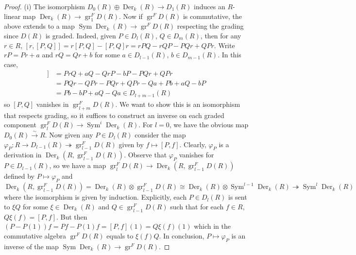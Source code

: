 \documentclass[11pt, a4paper]{article}
\theoremstyle{definition}
\newcommand{\gr}{\operatorname{gr}}
\newcommand{\Sym}[0]{\operatorname{Sym}}
\newcommand{\Der}{\operatorname{Der}}
\begin{document}
    \begin{proof}
        (i) The isomorphism $D_0(R)\oplus \Der_k(R)\to D_1(R)$ induces an $R$-linear map $\Der_k(R)\to \gr^F_1 D(R)$. Now if $\gr^F D(R)$ is commutative, the above extends to a map $\Sym\Der_k(R)\to \gr^F D(R)$ respecting the grading since $D(R)$ is graded. Indeed, given $P\in D_l(R)$, $Q\in D_m(R)$, then for any $r\in R$, $[r,[P, Q]]=r[P, Q]-[P, Q]r=rPQ-rQP-PQr+QPr$. Write $rP=Pr+a$ and $rQ=Qr+b$ for some $a\in D_{l-1}(R)$, $b\in D_{m-1}(R)$. In this case,
        \begin{align*}
            [r, [P, Q]]&=PrQ+aQ-QrP-bP-PQr+QPr\\
            &=PQr-QPr-PQr+QPr-Qa+Pb+aQ-bP\\
            &=Pb-bP+aQ-Qa\in D_{l+m-1}(R)
        \end{align*}
        so $[P, Q]$ vanishes in $\gr^F_{l+m}D(R)$. We want to show this is an isomorphism that respects grading, so it suffices to construct an inverse on each graded component $\gr^F_l D(R)\to \Sym^i \Der_k(R)$. For $l=0$, we have the obvious map $D_0(R)\xrightarrow{\sim} R$. Now given any $P\in D_l(R)$ consider the map $\varphi_P:R\to D_{l-1}(R)\twoheadrightarrow\gr^F_{l-1}D(R)$ given by $f\mapsto [P, f]$. Clearly, $\varphi_P$ is a derivation in $\Der_k(R, \gr^F_{l-1}D(R))$. Observe that $\varphi_P$ vanishes for $P\in D_{l-1}(R)$, so we have a map $\gr_l^FD(R)\to\Der_k(R, \gr^F_{l-1}D(R))$ defined by $P\mapsto\varphi_P$ and
        \[\Der_k(R, \gr^F_{l-1}D(R))=\Der_k(R)\otimes\gr^F_{l-1}D(R)\cong\Der_k(R)\otimes\Sym^{l-1}\Der_k(R)\twoheadrightarrow\Sym^l\Der_k(R)\]
        where the isomorphism is given by induction. Explicitly, each $P\in D_{l}(R)$ is sent to $\xi Q$ for some $\xi\in\Der_k(R)$ and $Q\in \gr^{F}_{l-1}D(R)$ such that for each $f\in R$, $Q\xi(f)=[P, f]$. But then $(P-P(1))f=Pf-P(1)f=[P, f](1)=Q\xi(f)(1)$ which in the commutative algebra $\gr^FD(R)$ equals to $\xi(f)Q$. In conclusion, $P\mapsto\varphi_P$ is an inverse of the map $\Sym\Der_k(R)\to\gr^FD(R)$.


\end{proof}
\end{document}
